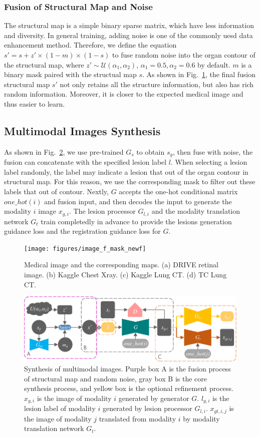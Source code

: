 \documentclass[runningheads]{llncs}
\begin{document}
	\subsubsection{Fusion of Structural Map and Noise}	
	The structural map is a simple binary sparse matrix, which have less information and diversity. In general training, adding noise is one of the commonly uesd data enhancement method. Therefore, we define the equation $s'=s+z'\times(1-m)\times(1-s)$ to fuse random noise into the organ contour of the structural map, where $z'\sim\mathcal{U}(\alpha_1,\alpha_2)$, $\alpha_1 =0.5,\alpha_2=0.6$ by default. $m$ is a binary mask paired with the structual map $s$. As shown in Fig.~\ref{image_and_f}, the final fusion structural map $s'$ not only retains all the structure information, but also has rich random information. Moreover, it is closer to the expected medical image and thus easier to learn. 	
	\subsection{Multimodal Images Synthesis}
	As shown in Fig.~\ref{mm_mri_generate}, we use pre-trained $G_s$ to obtain $s_g$, then fuse with noise, the fusion can concatenate with the specified lesion label $l$. When selecting a lesion label randomly, the label may indicate a lesion that out of the organ contour in structural map. For this reason, we use the corresponding mask to filter out these labels that out of contour. Nextly, $G$ accepts the one-hot conditional matrix $one\_hot(i)$ and fusion input, and then decodes the input to generate the modality $i$ image $x_{g,i}$. The lesion processor $G_{l,i}$ and the modality translation network $G_t$ train completedly in advance to provide the lesions generation guidance loss and the registration guidance loss for $G$.
	\begin{figure}[th]
		\centering
		\texttt{[image: figures/image\_f\_mask\_newf]}
		\caption{Medical image and the corresponding maps. (a) DRIVE retinal image. (b) Kaggle Chest Xray. (c) Kaggle Lung CT. (d) TC Lung CT.}
		\label{image_and_f}
	\end{figure}
	\begin{figure}[th]
		\centering
		\includegraphics[width=1\columnwidth]{figures/mm_mri_generate_train}
		\caption{Synthesis of multimodal images. Purple box A is the fusion process of structural map and random noise, gray box B is the core synthesis process, and yellow box is the optional refinement process. 
			$x_{g,i}$ is the image of modality $i$ generated by generator $G$. 
			$l_{g,i}$ is the lesion label of modality $i$ generated by lesion processor $G_{l,i}$.
			$x_{gt,i,j}$ is the image of modality $j$ translated from modality $i$ by modality translation network $G_t$.
		}
		\label{mm_mri_generate}
	\end{figure}
	
\end{document}
